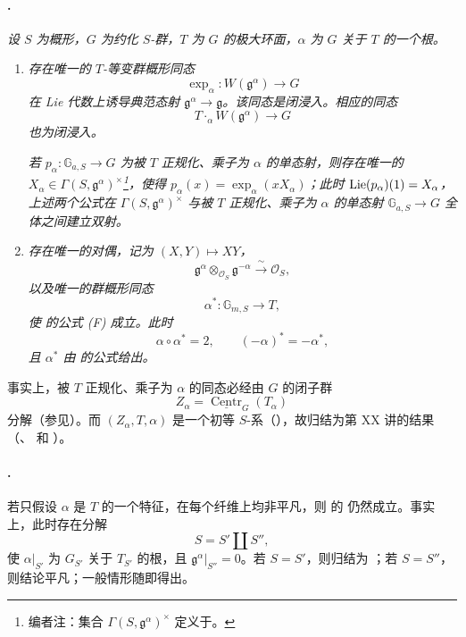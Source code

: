 \paragraph{.}
\textit{设 \(S\) 为概形，\(G\) 为约化 \(S\)-群，\(T\) 为 \(G\) 的极大环面，\(\alpha\) 为 \(G\) 关于 \(T\) 的一个根。}
\begin{enumerate}
\item[\SGAInlineRefTarget{sga3:xxii:thm:1.1:item:i}(i)] \textit{存在唯一的 \(T\)-等变群概形同态}
\[
  \exp_{\alpha}:W(\mathfrak g^{\alpha})\longrightarrow G
\]
\textit{在 Lie 代数上诱导典范态射 \(\mathfrak g^{\alpha}\to\mathfrak g\)。该同态是闭浸入。相应的同态}
\[
  T\mathbin{\cdot_{\alpha}}W(\mathfrak g^{\alpha})
  \longrightarrow G
\]
\textit{也为闭浸入。}

\textit{若 \(p_{\alpha}:\mathbb G_{a,S}\to G\) 为被 \(T\) 正规化、乘子为 \(\alpha\) 的单态射，则存在唯一的
\(X_{\alpha}\in\Gamma(S,\mathfrak g^{\alpha})^{\times}\)\footnote{编者注：集合 \(\Gamma(S,\mathfrak g^{\alpha})^{\times}\) 定义于。}，使得
\(p_{\alpha}(x)=\exp_{\alpha}(xX_{\alpha})\)；此时
\(\operatorname{Lie}(p_{\alpha})(1)=X_{\alpha}\)，上述两个公式在
\(\Gamma(S,\mathfrak g^{\alpha})^{\times}\) 与被 \(T\) 正规化、乘子为 \(\alpha\) 的单态射 \(\mathbb G_{a,S}\to G\) 全体之间建立双射。}

\item[(ii)] \textit{存在唯一的对偶，记为 \((X,Y)\longmapsto XY\)，}
\[
  \mathfrak g^{\alpha}\otimes_{\mathcal O_S}\mathfrak g^{-\alpha}
  \xrightarrow{\;\sim\;}\mathcal O_S,
\]
\textit{以及唯一的群概形同态}
\[
  \alpha^*:\mathbb G_{m,S}\longrightarrow T,
\]
\textit{使 的公式 \textup{(F)} 成立。此时}
\[
  \alpha\circ\alpha^*=2,
  \qquad
  (-\alpha)^*=-\alpha^*,
\]
\textit{且 \(\alpha^*\) 由 的公式给出。}
\end{enumerate}

事实上，被 \(T\) 正规化、乘子为 \(\alpha\) 的同态必经由 \(G\) 的闭子群
\[
  Z_\alpha=\underline{\operatorname{Centr}}_G(T_\alpha)
\]
分解（参见）。而 \((Z_\alpha,T,\alpha)\) 是一个初等 \(S\)-系（），故归结为第 XX 讲的结果（、 和 ）。

\paragraph{.}
若只假设 \(\alpha\) 是 \(T\) 的一个特征，在每个纤维上均非平凡，则 的  仍然成立。事实上，此时存在分解
\[
  S=S'\amalg S'',
\]
使 \(\alpha|_{S'}\) 为 \(G_{S'}\) 关于 \(T_{S'}\) 的根，且
\(\mathfrak g^\alpha|_{S''}=0\)。若 \(S=S'\)，则归结为 ；若 \(S=S''\)，则结论平凡；一般情形随即得出。

